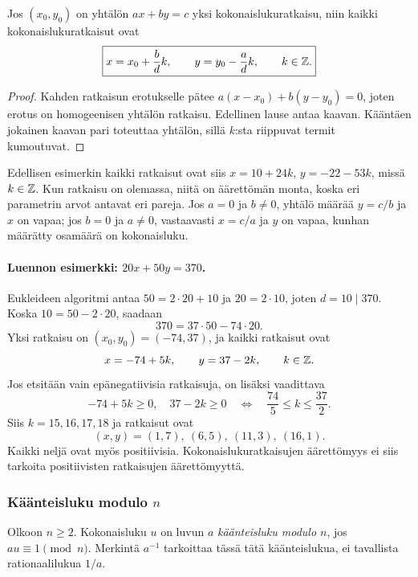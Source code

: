 \documentclass[11pt,a4paper]{amsart}
\begin{document}
\begin{theorem}
  Jos $(x_0,y_0)$ on yhtälön $ax+by=c$ yksi kokonaislukuratkaisu,
  niin kaikki kokonaislukuratkaisut ovat
  \[
    \boxed{x=x_0+\frac{b}{d}k,\qquad
    y=y_0-\frac{a}{d}k,\qquad k\in\mathbb{Z}.}
  \]
\end{theorem}
\begin{proof}
  Kahden ratkaisun erotukselle pätee
  $a(x-x_0)+b(y-y_0)=0$, joten erotus on homogeenisen yhtälön
  ratkaisu. Edellinen lause antaa kaavan. Kääntäen jokainen kaavan
  pari toteuttaa yhtälön, sillä $k$:sta riippuvat termit kumoutuvat.
\end{proof}
Edellisen esimerkin kaikki ratkaisut ovat siis
$x=10+24k$, $y=-22-53k$, missä $k\in\mathbb{Z}$.
Kun ratkaisu on olemassa, niitä on äärettömän monta, koska eri
parametrin arvot antavat eri pareja.
Jos $a=0$ ja $b\ne0$, yhtälö määrää $y=c/b$ ja $x$ on vapaa;
jos $b=0$ ja $a\ne0$, vastaavasti $x=c/a$ ja $y$ on vapaa,
kunhan määrätty osamäärä on kokonaisluku.

\paragraph{Luennon esimerkki: $20x+50y=370$.}
Eukleideen algoritmi antaa $50=2\cdot20+10$ ja $20=2\cdot10$,
joten $d=10\mid370$. Koska $10=50-2\cdot20$, saadaan
\[
  370=37\cdot50-74\cdot20.
\]
Yksi ratkaisu on $(x_0,y_0)=(-74,37)$, ja kaikki ratkaisut ovat
\[
  x=-74+5k,\qquad y=37-2k,\qquad k\in\mathbb{Z}.
\]
Jos etsitään vain epänegatiivisia ratkaisuja, on lisäksi vaadittava
\[
  -74+5k\ge0,\quad 37-2k\ge0
  \quad\Longleftrightarrow\quad
  \frac{74}{5}\le k\le\frac{37}{2}.
\]
Siis $k=15,16,17,18$ ja ratkaisut ovat
\[
  \boxed{(x,y)=(1,7),\ (6,5),\ (11,3),\ (16,1).}
\]
Kaikki neljä ovat myös positiivisia. Kokonaislukuratkaisujen
äärettömyys ei siis tarkoita positiivisten ratkaisujen äärettömyyttä.

\subsubsection{Käänteisluku modulo $n$}
Olkoon $n\ge2$. Kokonaisluku $u$ on luvun $a$ \emph{käänteisluku
modulo $n$}, jos $au\equiv1\pmod n$. Merkintä $a^{-1}$ tarkoittaa
tässä tätä käänteislukua, ei tavallista rationaalilukua $1/a$.
\end{document}

